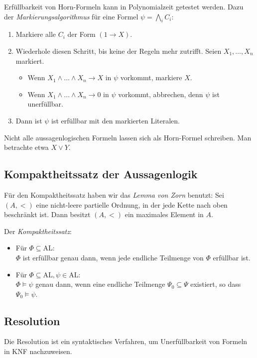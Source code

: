\documentclass[a4paper,parskip=half*,DIV=15,fontsize=11pt]{scrartcl}
\newcommand{\AL}{\mathrm{AL}}
\begin{document}
Erfüllbarkeit von Horn-Formeln kann in Polynomialzeit getestet werden. Dazu der \emph{Markierungsalgorithmus} für eine Formel $\psi = \bigwedge_i C_i$:
\begin{enumerate}
\item Markiere alle $C_i$ der Form $(1 \to X)$.
\item Wiederhole diesen Schritt, bis keine der Regeln mehr zutrifft. Seien $X_1, \ldots, X_n$ markiert.
    \begin{itemize}
        \item Wenn $X_1 \land \ldots \land X_n \to X$ in $\psi$ vorkommt, markiere $X$.
        \item Wenn $X_1 \land \ldots \land X_n \to 0$ in $\psi$ vorkommt, abbrechen, denn $\psi$ ist unerfüllbar.
    \end{itemize}
\item Dann ist $\psi$ ist erfüllbar mit den markierten Literalen.
\end{enumerate}

Nicht alle aussagenlogischen Formeln lassen sich als Horn-Formel schreiben. Man betrachte etwa $X \lor Y$.

\subsection{Kompaktheitssatz der Aussagenlogik}

Für den Kompaktheitssatz haben wir das \emph{Lemma von Zorn} benutzt: Sei $(A, <)$ eine nicht-leere partielle Ordnung, in der jede Kette nach oben beschränkt ist. Dann besitzt $(A, <)$ ein maximales Element in $A$.

Der \emph{Kompaktheitssatz}:
\begin{itemize}
\item Für $\Phi \subseteq \AL$:\\
$\Phi$ ist erfüllbar genau dann, wenn jede endliche Teilmenge von $\Phi$ erfüllbar ist.
\item
Für $\Phi \subseteq \AL, \psi \in \AL$:\\
$\Phi \models \psi$ genau dann, wenn eine endliche Teilmenge $\Psi_0 \subseteq \Psi$ existiert, so dass $\Psi_0 \models \psi$.
\end{itemize}

\subsection{Resolution}

Die Resolution ist ein syntaktisches Verfahren, um Unerfüllbarkeit von Formeln in KNF nachzuweisen.
\end{document}
